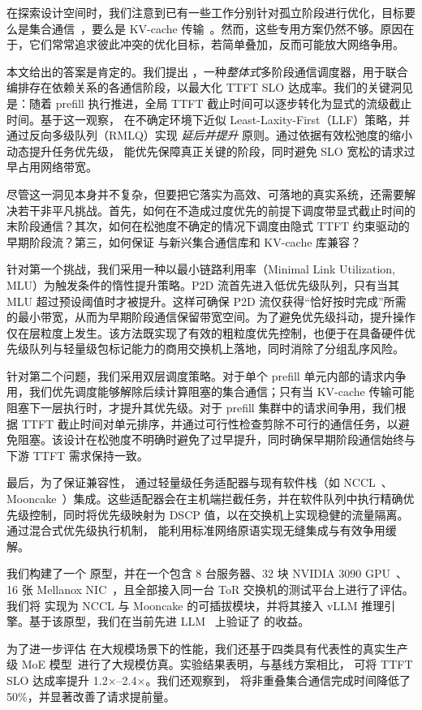 在探索设计空间时，我们注意到已有一些工作分别针对孤立阶段进行优化，目标要么是集合通信~\cite{rajasekaran2024cassini,cao2024crux,xu2025autoccl,cao2025syccl,si2025collective}，要么是 KV-cache 传输~\cite{strati2024d,cachegen,chen2024kvdirect,mooncakefast}。然而，这些专用方案仍然不够。原因在于，它们常常追求彼此冲突的优化目标，若简单叠加，反而可能放大网络争用。

本文给出的答案是肯定的。我们提出 \sys{}，一种\emph{整体式}多阶段通信调度器，用于联合编排存在依赖关系的各通信阶段，以最大化 TTFT SLO 达成率。我们的关键洞见是：随着 prefill 执行推进，全局 TTFT 截止时间可以逐步转化为显式的流级截止时间。基于这一观察，\sys{} 在不确定环境下近似 Least-Laxity-First（LLF）策略，并通过反向多级队列（RMLQ）实现 \emph{延后并提升} 原则。通过依据有效松弛度的缩小动态提升任务优先级，\sys{} 能优先保障真正关键的阶段，同时避免 SLO 宽松的请求过早占用网络带宽。

尽管这一洞见本身并不复杂，但要把它落实为高效、可落地的真实系统，还需要解决若干非平凡挑战。首先，如何在不造成过度优先的前提下调度带显式截止时间的末阶段通信？其次，如何在松弛度不确定的情况下调度由隐式 TTFT 约束驱动的早期阶段流？第三，如何保证 \sys{} 与新兴集合通信库和 KV-cache 库兼容？

针对第一个挑战，我们采用一种以最小链路利用率（Minimal Link Utilization, MLU）为触发条件的惰性提升策略。P2D 流首先进入低优先级队列，只有当其 MLU 超过预设阈值时才被提升。这样可确保 P2D 流仅获得“恰好按时完成”所需的最小带宽，从而为早期阶段通信保留带宽空间。为了避免优先级抖动，提升操作仅在层粒度上发生。该方法既实现了有效的粗粒度优先控制，也便于在具备硬件优先级队列与轻量级包标记能力的商用交换机上落地，同时消除了分组乱序风险。

针对第二个问题，我们采用双层调度策略。对于单个 prefill 单元内部的请求内争用，我们优先调度能够解除后续计算阻塞的集合通信；只有当 KV-cache 传输可能阻塞下一层执行时，才提升其优先级。对于 prefill 集群中的请求间争用，我们根据 TTFT 截止时间对单元排序，并通过可行性检查剪除不可行的通信任务，以避免阻塞。该设计在松弛度不明确时避免了过早提升，同时确保早期阶段通信始终与下游 TTFT 需求保持一致。

最后，为了保证兼容性，\sys{} 通过轻量级任务适配器与现有软件栈（如 NCCL~\cite{nccl}、Mooncake~\cite{mooncakeTE}）集成。这些适配器会在主机端拦截任务，并在软件队列中执行精确优先级控制，同时将优先级映射为 DSCP 值，以在交换机上实现稳健的流量隔离。通过混合式优先级执行机制，\sys{} 能利用标准网络原语实现无缝集成与有效争用缓解。

我们构建了一个 \sys 原型，并在一个包含 8 台服务器、32 块 NVIDIA 3090 GPU~\cite{nvidia3090}、16 张 Mellanox NIC~\cite{cx5}，且全部接入同一台 ToR 交换机的测试平台上进行了评估。我们将 \sys{} 实现为 NCCL 与 Mooncake 的可插拔模块，并将其接入 vLLM 推理引擎。基于该原型，我们在当前先进 LLM~\cite{mixtral7b} 上验证了 \sys{} 的收益。

为了进一步评估 \sys{} 在大规模场景下的性能，我们还基于四类具有代表性的真实生产级 MoE 模型~\cite{mixtral22b,grok,dbrx,qwen-coder}进行了大规模仿真。实验结果表明，与基线方案相比，\sys{} 可将 TTFT SLO 达成率提升 1.2$\times$--2.4$\times$。我们还观察到，\sys{} 将非重叠集合通信完成时间降低了 50\%，并显著改善了请求提前量。

